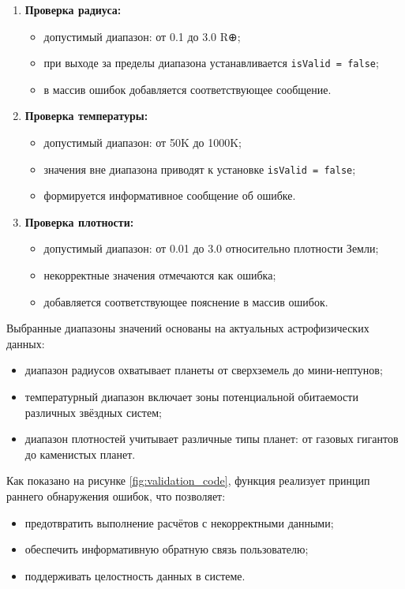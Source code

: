 \begin{enumerate}
    \item \textbf{Проверка радиуса:}
    \begin{itemize}
        \item допустимый диапазон: от 0.1 до 3.0 R⊕;
        \item при выходе за пределы диапазона устанавливается \texttt{isValid = false};
        \item в массив ошибок добавляется соответствующее сообщение.
    \end{itemize}

    \item \textbf{Проверка температуры:}
    \begin{itemize}
        \item допустимый диапазон: от 50K до 1000K;
        \item значения вне диапазона приводят к установке \texttt{isValid = false};
        \item формируется информативное сообщение об ошибке.
    \end{itemize}

    \item \textbf{Проверка плотности:}
    \begin{itemize}
        \item допустимый диапазон: от 0.01 до 3.0 относительно плотности Земли;
        \item некорректные значения отмечаются как ошибка;
        \item добавляется соответствующее пояснение в массив ошибок.
    \end{itemize}
\end{enumerate}

Выбранные диапазоны значений основаны на актуальных астрофизических данных:
\begin{itemize}
    \item диапазон радиусов охватывает планеты от сверхземель до мини-нептунов;
    \item температурный диапазон включает зоны потенциальной обитаемости различных звёздных систем;
    \item диапазон плотностей учитывает различные типы планет: от газовых гигантов до каменистых планет.
\end{itemize}

Как показано на рисунке \ref{fig:validation_code}, функция реализует принцип раннего обнаружения ошибок, что позволяет:
\begin{itemize}
    \item предотвратить выполнение расчётов с некорректными данными;
    \item обеспечить информативную обратную связь пользователю;
    \item поддерживать целостность данных в системе.
\end{itemize}

